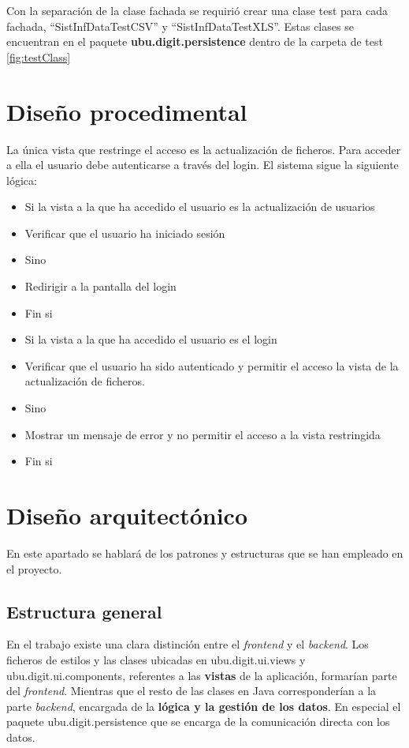 Con la separación de la clase fachada se requirió crear una clase test para cada fachada, ``SistInfDataTestCSV'' y ``SistInfDataTestXLS''. Estas clases se encuentran en el paquete \textbf{ubu.digit.persistence} dentro de la carpeta de test \ref{fig:testClass}


\section{Diseño procedimental}
La única vista que restringe el acceso es la actualización de ficheros. Para acceder a ella el usuario debe autenticarse a través del login. El sistema sigue la siguiente lógica:	
\begin{itemize}
	\item Si la vista a la que ha accedido el usuario es la actualización de usuarios
	\item Verificar que el usuario ha iniciado sesión 
	\item Sino 
	\item Redirigir a la pantalla del login
	\item Fin si
	
	\item Si la vista a la que ha accedido el usuario es el login
	\item Verificar que el usuario ha sido autenticado y permitir el acceso la vista de la actualización de ficheros.
	\item Sino 
	\item Mostrar un mensaje de error y no permitir el acceso a la vista restringida
	\item Fin si	
\end{itemize}

\section{Diseño arquitectónico}
En este apartado se hablará de los patrones y estructuras que se han empleado en el proyecto.

\subsection{Estructura general}
En el trabajo existe una clara distinción entre el \emph{frontend} y el \emph{backend}. 
Los ficheros de estilos y las clases ubicadas en ubu.digit.ui.views y ubu.digit.ui.components, referentes a las \textbf{vistas} de la aplicación, formarían parte del \emph{frontend}. 
Mientras que el resto de las clases en Java corresponderían a la parte \emph{backend}, encargada de la \textbf{lógica y la gestión de los datos}. En especial el paquete ubu.digit.persistence que se encarga de la comunicación directa con los datos. 

